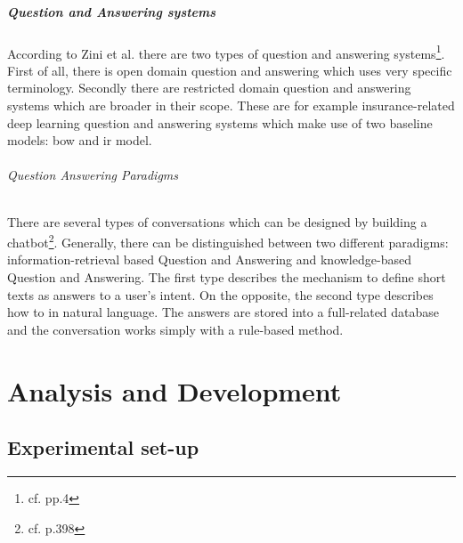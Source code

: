 \paragraph{Question and Answering systems}
According to Zini et al. there are two types of question and answering systems\footnote{cf.\autocite{zini} pp.4}. First of all, there is open domain question and answering which uses very specific terminology. Secondly there are restricted domain question and answering systems which are broader in their scope. These are for example insurance-related deep learning question and answering systems which make use of two baseline models: \ac{bow} and \ac{ir} model. 

\subparagraph{Question Answering Paradigms}
There are several types of conversations which can be designed by building a chatbot\footnote{cf.\autocite{akhtar} p.398}. Generally, there can be distinguished between two different paradigms: information-retrieval based Question and Answering and knowledge-based Question and Answering. The first type describes the mechanism to define short texts as answers to a user's intent. On the opposite, the second type describes how to in natural language. The answers are stored into a full-related database and the conversation works simply with a rule-based method.

\chapter{Analysis and Development}

\section{Experimental set-up} \label{first_ideas}

